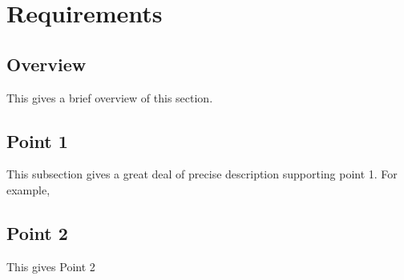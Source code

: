\section{Requirements}
\label{sec:Requirements}

\subsection{Overview} 
This gives a brief overview of this section.

\subsection{Point 1}
This subsection gives a great deal of precise description supporting point 1.  For example,


\subsection{Point 2}
This gives Point 2
